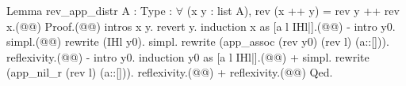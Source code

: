 Lemma rev_app_distr {A : Type} : $\forall$ (x y : list A), rev (x ++ y) = rev y ++ rev x.(@\vspace{-0.04cm}@)
Proof.(@\vspace{-0.04cm}@)
  intros x y. revert y. induction x as [a l IHl|].(@\vspace{-0.04cm}@)
  - intro y0. simpl.(@\vspace{-0.04cm}@)
    rewrite (IHl y0). simpl. rewrite (app_assoc (rev y0) (rev l) (a::[])). reflexivity.(@\vspace{-0.04cm}@)
  - intro y0. induction y0 as [a l IHl|].(@\vspace{-0.04cm}@)
    + simpl. rewrite (app_nil_r (rev l) (a::[])). reflexivity.(@\vspace{-0.04cm}@)
    + reflexivity.(@\vspace{-0.04cm}@)
Qed.
